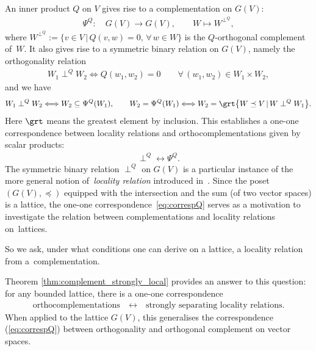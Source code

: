 \documentclass[pdftex]{sigma}
\numberwithin{equation}{section}
\newcommand{\loc}{locality\xspace}
\newcommand{\pone}{separating\xspace }
\begin{document}
 An inner product $Q$ on $V$ gives rise to a
complementation on $G(V)$:
\begin{gather*}
\Psi^Q\colon\quad	G(V)\longrightarrow G(V),\qquad
	W \longmapsto	 W^{\perp^Q},
\end{gather*}
 where $W^{\perp^Q}:=\{v\in V\,|\, Q(v, w)=0,\, \forall\, w\in W\}$ is the $Q$-orthogonal complement of~$W$. It also gives rise to a symmetric binary relation on $G(V)$, namely the orthogonality relation
\begin{gather}
\label{eq:introQW}
W_1\perp^Q W_2\Longleftrightarrow Q(w_1, w_2)=0\qquad
\forall\, (w_1, w_2)\in W_1\times W_2,
\end{gather}
and we have
\begin{gather*}
W_1\perp^Q W_2\Longleftrightarrow W_2\subseteq \Psi^Q(W_1),\qquad
W_2=\Psi^Q(W_1)\Longleftrightarrow W_2=\grt \big\{ W \preceq V\,|\, W\perp^QW_1\big\}.
\end{gather*}
Here $\grt $ means the greatest element by inclusion. This establishes a one-one correspondence between locality relations and orthocomplementations given by scalar products:
\begin{gather}\label{eq:correspQ}
\perp^Q\longleftrightarrow \Psi^Q.
\end{gather}
The symmetric binary relation $\perp^Q$ on $G(V)$ is a particular instance of the more general notion of~{\it locality relation} introduced in~\cite{CGPZ1}. Since the poset $(G(V), \preceq)$ equipped with the intersection and the sum (of two vector spaces) is a lattice, the one-one correspondence~\eqref{eq:correspQ} serves as a motivation to investigate the relation between complementations and \loc relations on~lattices.

So we ask, under what conditions one can derive on a lattice, a \loc relation from a~com\-p\-le\-men\-tation.

Theorem \ref {thm:complement_strongly_local} provides an answer to this question:
for any bounded lattice, there is a one-one correspondence
\begin{gather}\label{eq:corresp}
\text{orthocomplementations} \quad \longleftrightarrow\quad \text{strongly \pone \loc relations.} \end{gather}
When applied to
	the lattice $G(V)$, this generalises the correspondence (\ref{eq:correspQ}) between orthogonality and orthogonal complement on vector spaces.
	
\end{document}
